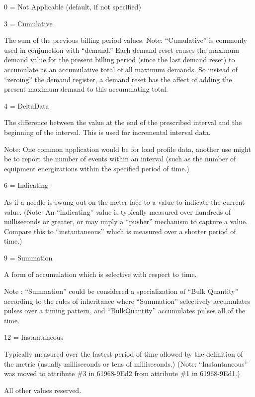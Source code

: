 0 = Not Applicable (default, if not specified)

3 = Cumulative

The sum of the previous billing period values. Note\+: “\+Cumulative” is commonly used in conjunction with “demand.\+” Each demand reset causes the maximum demand value for the present billing period (since the last demand reset) to accumulate as an accumulative total of all maximum demands. So instead of “zeroing” the demand register, a demand reset has the affect of adding the present maximum demand to this accumulating total.

4 = Delta\+Data

The difference between the value at the end of the prescribed interval and the beginning of the interval. This is used for incremental interval data.

Note\+: One common application would be for load profile data, another use might be to report the number of events within an interval (such as the number of equipment energizations within the specified period of time.)

6 = Indicating

As if a needle is swung out on the meter face to a value to indicate the current value. (Note\+: An “indicating” value is typically measured over hundreds of milliseconds or greater, or may imply a “pusher” mechanism to capture a value. Compare this to “instantaneous” which is measured over a shorter period of time.)

9 = Summation

A form of accumulation which is selective with respect to time.

Note \+: “\+Summation” could be considered a specialization of “\+Bulk Quantity” according to the rules of inheritance where “\+Summation” selectively accumulates pulses over a timing pattern, and “\+Bulk\+Quantity” accumulates pulses all of the time.

12 = Instantaneous

Typically measured over the fastest period of time allowed by the definition of the metric (usually milliseconds or tens of milliseconds.) (Note\+: “\+Instantaneous” was moved to attribute \#3 in 61968-\/9\+Ed2 from attribute \#1 in 61968-\/9\+Ed1.)

All other values reserved. 